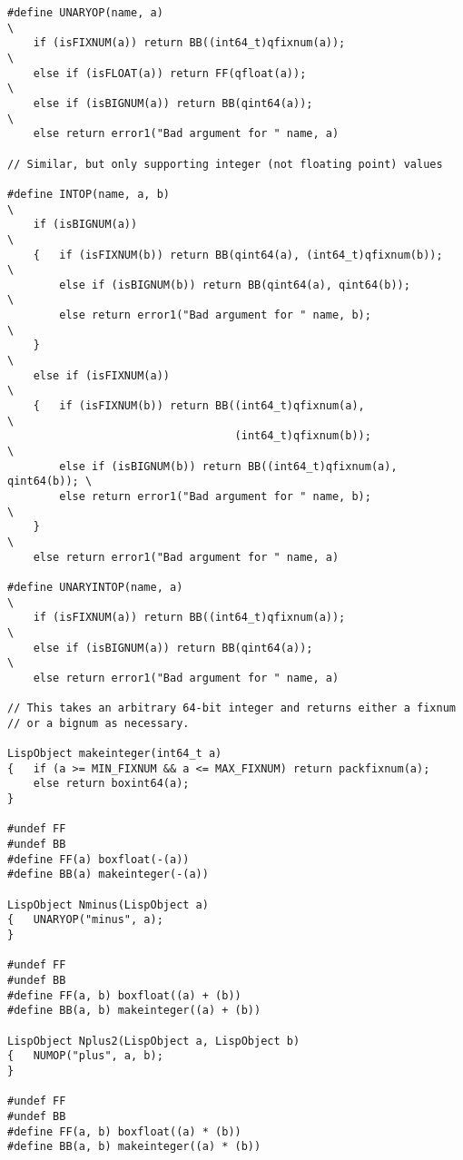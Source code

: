 {\begin{verbatim}
#define UNARYOP(name, a)                                                 \
    if (isFIXNUM(a)) return BB((int64_t)qfixnum(a));                     \
    else if (isFLOAT(a)) return FF(qfloat(a));                           \
    else if (isBIGNUM(a)) return BB(qint64(a));                          \
    else return error1("Bad argument for " name, a)

// Similar, but only supporting integer (not floating point) values

#define INTOP(name, a, b)                                                \
    if (isBIGNUM(a))                                                     \
    {   if (isFIXNUM(b)) return BB(qint64(a), (int64_t)qfixnum(b));      \
        else if (isBIGNUM(b)) return BB(qint64(a), qint64(b));           \
        else return error1("Bad argument for " name, b);                 \
    }                                                                    \
    else if (isFIXNUM(a))                                                \
    {   if (isFIXNUM(b)) return BB((int64_t)qfixnum(a),                  \
                                   (int64_t)qfixnum(b));                 \
        else if (isBIGNUM(b)) return BB((int64_t)qfixnum(a), qint64(b)); \
        else return error1("Bad argument for " name, b);                 \
    }                                                                    \
    else return error1("Bad argument for " name, a)

#define UNARYINTOP(name, a)                                              \
    if (isFIXNUM(a)) return BB((int64_t)qfixnum(a));                     \
    else if (isBIGNUM(a)) return BB(qint64(a));                          \
    else return error1("Bad argument for " name, a)

// This takes an arbitrary 64-bit integer and returns either a fixnum
// or a bignum as necessary.

LispObject makeinteger(int64_t a)
{   if (a >= MIN_FIXNUM && a <= MAX_FIXNUM) return packfixnum(a);
    else return boxint64(a);
}

#undef FF
#undef BB
#define FF(a) boxfloat(-(a))
#define BB(a) makeinteger(-(a))

LispObject Nminus(LispObject a)
{   UNARYOP("minus", a);
}

#undef FF
#undef BB
#define FF(a, b) boxfloat((a) + (b))
#define BB(a, b) makeinteger((a) + (b))

LispObject Nplus2(LispObject a, LispObject b)
{   NUMOP("plus", a, b);
}

#undef FF
#undef BB
#define FF(a, b) boxfloat((a) * (b))
#define BB(a, b) makeinteger((a) * (b))


\end{verbatim}}
